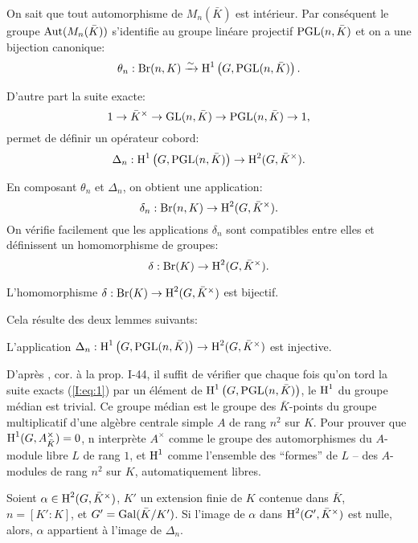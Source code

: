 \documentclass[oneside]{book}
\begin{document}
On sait que tout automorphisme de $M_n(\bar K)$ est intérieur. Par 
conséquent le groupe $\operatorname{Aut}(M_n(\bar K))$ s'identifie au groupe linéare 
projectif $\operatorname{PGL}(n,\bar K)$ et on a une bijection canonique:
\[
  \theta_n : \operatorname{Br}(n,K) \xrightarrow\sim \operatorname{H}^1\left(G,\operatorname{PGL}(n,\bar K)\right)\text{.}
\]

D'autre part la suite exacte:
\begin{equation}\label{I:eq:1}
  1 \to \bar K^\times \to \operatorname{GL}(n,\bar K) \to \operatorname{PGL}(n,\bar K) \to 1\text{,}
\end{equation}
permet de définir un opérateur cobord:
\[
  \Delta_n : \operatorname{H}^1\left(G,\operatorname{PGL}(n,\bar K)\right) \to \operatorname{H}^2(G,\bar K^\times)\text{.}
\]

En composant $\theta_n$ et $\Delta_n$, on obtient une application:
\[
  \delta_n : \operatorname{Br}(n,K) \to \operatorname{H}^2(G,\bar K^\times)\text{.}
\]
On vérifie facilement que les applications $\delta_n$ sont compatibles entre 
elles et définissent un homomorphisme de groupes:
\[
  \delta : \operatorname{Br}(K) \to \operatorname{H}^2(G,\bar K^\times)\text{.}
\]





\begin{proposition}\label{I:3-1-3}
L'homomorphisme $\delta:\operatorname{Br}(K)\to \operatorname{H}^2(G,\bar K^\times)$ est bijectif. 
\end{proposition}

Cela résulte des deux lemmes suivants:





\begin{lemma}\label{I:3-1-4}
L'application 
$\Delta_n:\operatorname{H}^1\left(G,\operatorname{PGL}(n,\bar K)\right)\to \operatorname{H}^2(G,\bar K^\times)$ est 
injective.
\end{lemma}

D'après \cite{14}, cor. à la prop. I-44, il suffit de vérifier que chaque 
fois qu'on tord la suite exacts (\ref{I:eq:1}) par un élément de 
$\operatorname{H}^1\left(G,\operatorname{PGL}(n,\bar K)\right)$, le $\operatorname{H}^1$ du groupe médian est trivial. 
Ce groupe médian est le groupe des $\bar K$-points du groupe multiplicatif 
d'une algèbre centrale simple $A$ de rang $n^2$ sur $K$. Pour prouver que 
$\operatorname{H}^1(G,A_{\bar K}^\times) = 0$, n interprète $A^\times$ comme le groupe 
des automorphismes du $A$-module libre $L$ de rang $1$, et $\operatorname{H}^1$ comme 
l'ensemble des ``formes'' de $L$ -- des $A$-modules de rang $n^2$ sur $K$, 
automatiquement libres. 





\begin{lemma}\label{I:3-1-5}
Soient $\alpha\in \operatorname{H}^2(G,\bar K^\times)$, $K'$ un extension finie de $K$ 
contenue dans $\bar K$, $n=[K':K]$, et $G'=\operatorname{Gal}(\bar K/K')$. Si l'image de 
$\alpha$ dans $\operatorname{H}^2(G',\bar K^\times)$ est nulle, alors, $\alpha$ appartient 
à l'image de $\Delta_n$. 
\end{lemma}
\end{document}
